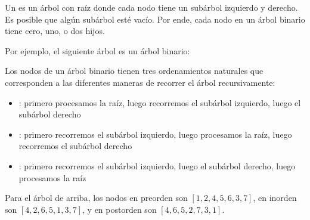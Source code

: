 \begin{samepage}

    Un  es un árbol con raíz donde cada nodo
    tiene un subárbol izquierdo y derecho. Es posible que algún subárbol
    esté vacío. Por ende, cada nodo en un árbol binario tiene cero, uno,
    o dos hijos.

    Por ejemplo, el siguiente árbol es un árbol binario:
    \begin{center}
    \end{center}
\end{samepage}


Los nodos de un árbol binario tienen tres ordenamientos naturales
que corresponden a las diferentes maneras de recorrer el árbol
recursivamente:

\begin{itemize}
    \item {}: primero procesamos la raíz, luego recorremos el
          subárbol izquierdo, luego el subárbol derecho
    \item {}: primero recorremos el subárbol izquierdo,
          luego procesamos la raíz, luego recorremos el subárbol derecho
    \item {}: primero recorremos el subárbol izquierdo,
          luego el subárbol derecho, luego procesamos la raíz
\end{itemize}

Para el árbol de arriba, los nodos en preorden son $[1,2,4,5,6,3,7]$,
en inorden son $[4,2,6,5,1,3,7]$, y en postorden son $[4,6,5,2,7,3,1]$.

